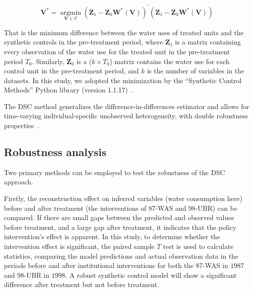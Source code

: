 \begin{equation}
    \mathbf{V}^{*}=\underset{\mathbf{V} \in \mathcal{V}}{\operatorname{argmin}}\left(\mathbf{Z}_{1}-\mathbf{Z}_{0} \mathbf{W}^{*}(\mathbf{V})\right)^{\prime}\left(\mathbf{Z}_{1}-\mathbf{Z}_{0} \mathbf{W}^{*}(\mathbf{V})\right)
\end{equation}

That is the minimum difference between the water uses of treated units and the synthetic controls in the pre-treatment period, where $\mathbf{Z}_{1}$ is a matrix containing every observation of the water use for the treated unit in the pre-treatment period $T_0$.
Similarly, $\mathbf{Z}_{0}$ is a ($k \times T_0$) matrix contains the water use for each control unit in the pre-treatment period, and $k$ is the number of variables in the datasets.
In this study, we adopted the minimization by the ``Synthetic Control Methods'' Python library (version 1.1.17)~\cite{engelbrektson2023}.

The DSC method generalizes the difference-in-differences estimator and allows for time-varying individual-specific unobserved heterogeneity, with double robustness properties~\cite{billmeier2013, smith2015}.

\subsection{Robustness analysis}\label{sec:robustness}

Two primary methods can be employed to test the robustness of the DSC approach.

Firstly, the reconstruction effect on inferred variables (water consumption here) before and after treatment (the interventions of 87-WAS and 98-UBR) can be compared.
If there are small gaps between the predicted and observed values before treatment, and a large gap after treatment, it indicates that the policy intervention's effect is apparent.
In this study, to determine whether the intervention effect is significant, the paired sample $T$ test is used to calculate statistics, comparing the model predictions and actual observation data in the periods before and after institutional interventions for both the 87-WAS in $1987$ and 98-UBR in $1998$.
A robust synthetic control model will show a significant difference after treatment but not before treatment.

